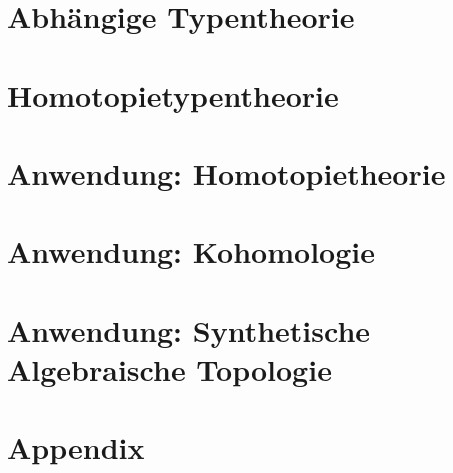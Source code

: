 \documentclass{../util/hott}
\begin{document}
\section{Abhängige Typentheorie}


\pagebreak
\section{Homotopietypentheorie}


\pagebreak
\section{Anwendung: Homotopietheorie}


\pagebreak
\section{Anwendung: Kohomologie}


\pagebreak
\section{Anwendung: Synthetische Algebraische Topologie}


\pagebreak
\appendix
\section{Appendix}


\printindex

\printbibliography
\end{document}

